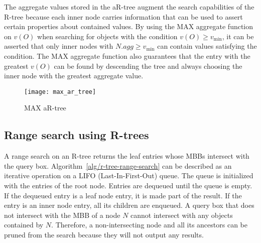 The aggregate values stored in the aR-tree augment the search capabilities of the R-tree because each inner node carries information that can be used to assert certain properties about contained values. By using the MAX aggregate function on \(v(O)\) when searching for objects with the condition \(v(O) \geq v_{\min}\), it can be asserted that only inner nodes with \(N.agg \geq v_{\min}\) can contain values satisfying the condition. The MAX aggregate function also guarantees that the entry with the greatest \(v(O)\) can be found by descending the tree and always choosing the inner node with the greatest aggregate value.

\begin{figure}[h]
    \centering
    \texttt{[image: max\_ar\_tree]}
    \caption{MAX aR-tree}
    \label{fig:max-ar-tree}
\end{figure}


\subsection{Range search using R-trees}

A range search on an R-tree returns the leaf entries whose MBBs intersect with the query box. Algorithm~\ref{alg/r-tree-range-search} can be described as an iterative operation on a LIFO (Last-In-First-Out) queue. The queue is initialized with the entries of the root node. Entries are dequeued until the queue is empty. If the dequeued entry is a leaf node entry, it is made part of the result. If the entry is an inner node entry, all its children are enqueued. A query box that does not intersect with the MBB of a node \(N\) cannot intersect with any objects contained by \(N\). Therefore, a non-intersecting node and all its ancestors can be pruned from the search because they will not output any results.

